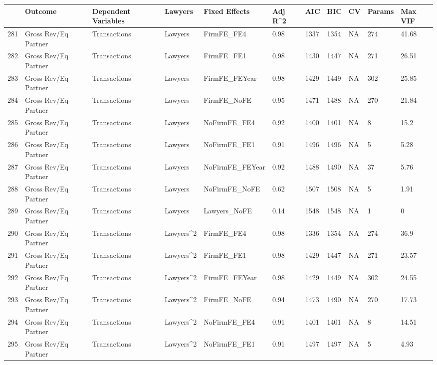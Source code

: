 \begin{table}[ht]
\centering
\begin{tabular}{rllllllllll}
  \hline
 & Outcome & Dependent Variables & Lawyers & Fixed Effects & Adj R^2 & AIC & BIC & CV & Params & Max VIF \\ 
  \hline
281 & Gross Rev/Eq Partner & Transactions & Lawyers & FirmFE\_FE4 & 0.98 & 1337 & 1354 & NA & 274 & 41.68 \\ 
  282 & Gross Rev/Eq Partner & Transactions & Lawyers & FirmFE\_FE1 & 0.98 & 1430 & 1447 & NA & 271 & 26.51 \\ 
  283 & Gross Rev/Eq Partner & Transactions & Lawyers & FirmFE\_FEYear & 0.98 & 1429 & 1449 & NA & 302 & 25.85 \\ 
  284 & Gross Rev/Eq Partner & Transactions & Lawyers & FirmFE\_NoFE & 0.95 & 1471 & 1488 & NA & 270 & 21.84 \\ 
  285 & Gross Rev/Eq Partner & Transactions & Lawyers & NoFirmFE\_FE4 & 0.92 & 1400 & 1401 & NA & 8 & 15.2 \\ 
  286 & Gross Rev/Eq Partner & Transactions & Lawyers & NoFirmFE\_FE1 & 0.91 & 1496 & 1496 & NA & 5 & 5.28 \\ 
  287 & Gross Rev/Eq Partner & Transactions & Lawyers & NoFirmFE\_FEYear & 0.92 & 1488 & 1490 & NA & 37 & 5.76 \\ 
  288 & Gross Rev/Eq Partner & Transactions & Lawyers & NoFirmFE\_NoFE & 0.62 & 1507 & 1508 & NA & 5 & 1.91 \\ 
  289 & Gross Rev/Eq Partner & Transactions & Lawyers & Lawyers\_NoFE & 0.14 & 1548 & 1548 & NA & 1 & 0 \\ 
  290 & Gross Rev/Eq Partner & Transactions & Lawyers^2 & FirmFE\_FE4 & 0.98 & 1336 & 1354 & NA & 274 & 36.9 \\ 
  291 & Gross Rev/Eq Partner & Transactions & Lawyers^2 & FirmFE\_FE1 & 0.98 & 1429 & 1447 & NA & 271 & 23.57 \\ 
  292 & Gross Rev/Eq Partner & Transactions & Lawyers^2 & FirmFE\_FEYear & 0.98 & 1429 & 1449 & NA & 302 & 24.55 \\ 
  293 & Gross Rev/Eq Partner & Transactions & Lawyers^2 & FirmFE\_NoFE & 0.94 & 1473 & 1490 & NA & 270 & 17.73 \\ 
  294 & Gross Rev/Eq Partner & Transactions & Lawyers^2 & NoFirmFE\_FE4 & 0.91 & 1401 & 1401 & NA & 8 & 14.51 \\ 
  295 & Gross Rev/Eq Partner & Transactions & Lawyers^2 & NoFirmFE\_FE1 & 0.91 & 1497 & 1497 & NA & 5 & 4.93 \\ 

\end{tabular}
\end{table}
